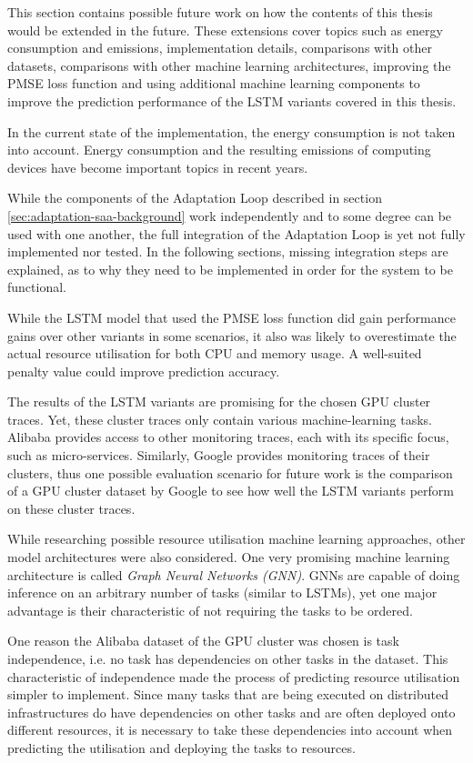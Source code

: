         This section contains possible future work on how the contents of this thesis would be extended in the future.
        These extensions cover topics such as energy consumption and \COTWO emissions, implementation details, comparisons with other datasets, comparisons with other machine learning architectures, improving the PMSE loss function and using additional machine learning components to improve the prediction performance of the LSTM variants covered in this thesis.
        
        In the current state of the implementation, the energy consumption is not taken into account.
        Energy consumption and the resulting \COTWO emissions of computing devices have become important topics in recent years.

        While the components of the Adaptation Loop described in section \ref{sec:adaptation-saa-background} work independently and to some degree can be used with one another, the full integration of the Adaptation Loop is yet not fully implemented nor tested.
        In the following sections, missing integration steps are explained, as to why they need to be implemented in order for the system to be functional.

        While the LSTM model that used the PMSE loss function did gain performance gains over other variants in some scenarios, it also was likely to overestimate the actual resource utilisation for both CPU and memory usage.
        A well-suited penalty value could improve prediction accuracy.

        The results of the LSTM variants are promising for the chosen GPU cluster traces. 
        Yet, these cluster traces only contain various machine-learning tasks. 
        Alibaba provides access to other monitoring traces, each with its specific focus, such as micro-services.
        Similarly, Google provides monitoring traces of their clusters, thus one possible evaluation scenario for future work is the comparison of a GPU cluster dataset by Google to see how well the LSTM variants perform on these cluster traces.

        While researching possible resource utilisation machine learning approaches, other model architectures were also considered.
        One very promising machine learning architecture is called \emph{Graph Neural Networks (GNN)}.
        GNNs are capable of doing inference on an arbitrary number of tasks (similar to LSTMs), yet one major advantage is their characteristic of not requiring the tasks to be ordered.

        One reason the Alibaba dataset of the GPU cluster was chosen is task independence, i.e. no task has dependencies on other tasks in the dataset.
        This characteristic of independence made the process of predicting resource utilisation simpler to implement.
        Since many tasks that are being executed on distributed infrastructures do have dependencies on other tasks and are often deployed onto different resources, it is necessary to take these dependencies into account when predicting the utilisation and deploying the tasks to resources.

        